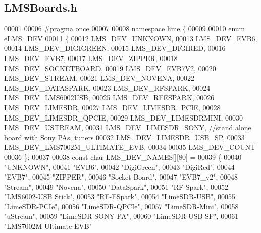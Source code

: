 \subsection{L\+M\+S\+Boards.\+h}
\label{LMSBoards_8h_source}

\begin{DoxyCode}
00001 
00006 \textcolor{preprocessor}{#pragma once}
00007 
00008 \textcolor{keyword}{namespace }lime \{
00009 
00010 \textcolor{keyword}{enum} eLMS_DEV
00011 \{
00012     LMS_DEV_UNKNOWN,
00013     LMS_DEV_EVB6,
00014     LMS_DEV_DIGIGREEN,
00015     LMS_DEV_DIGIRED,
00016     LMS_DEV_EVB7,
00017     LMS_DEV_ZIPPER,
00018     LMS_DEV_SOCKETBOARD,
00019     LMS_DEV_EVB7V2,
00020     LMS_DEV_STREAM,
00021     LMS_DEV_NOVENA,
00022     LMS_DEV_DATASPARK,
00023     LMS_DEV_RFSPARK,
00024     LMS_DEV_LMS6002USB,
00025     LMS_DEV_RFESPARK,
00026     LMS_DEV_LIMESDR,
00027     LMS_DEV_LIMESDR_PCIE,
00028     LMS_DEV_LIMESDR_QPCIE,
00029     LMS_DEV_LIMESDRMINI,
00030     LMS_DEV_USTREAM,
00031     LMS_DEV_LIMESDR_SONY, \textcolor{comment}{//stand alone board with Sony PAs, tuners}
00032     LMS_DEV_LIMESDR_USB_SP,
00033     LMS_DEV_LMS7002M_ULTIMATE_EVB,
00034 
00035     LMS_DEV_COUNT
00036 \};
00037 
00038 \textcolor{keyword}{const} \textcolor{keywordtype}{char} LMS_DEV_NAMES[][80] =
00039 \{
00040     \textcolor{stringliteral}{"UNKNOWN"},
00041     \textcolor{stringliteral}{"EVB6"},
00042     \textcolor{stringliteral}{"DigiGreen"},
00043     \textcolor{stringliteral}{"DigiRed"},
00044     \textcolor{stringliteral}{"EVB7"},
00045     \textcolor{stringliteral}{"ZIPPER"},
00046     \textcolor{stringliteral}{"Socket Board"},
00047     \textcolor{stringliteral}{"EVB7\_v2"},
00048     \textcolor{stringliteral}{"Stream"},
00049     \textcolor{stringliteral}{"Novena"},
00050     \textcolor{stringliteral}{"DataSpark"},
00051     \textcolor{stringliteral}{"RF-Spark"},
00052     \textcolor{stringliteral}{"LMS6002-USB Stick"},
00053     \textcolor{stringliteral}{"RF-ESpark"},
00054     \textcolor{stringliteral}{"LimeSDR-USB"},
00055     \textcolor{stringliteral}{"LimeSDR-PCIe"},
00056     \textcolor{stringliteral}{"LimeSDR-QPCIe"},
00057     \textcolor{stringliteral}{"LimeSDR-Mini"},
00058     \textcolor{stringliteral}{"uStream"},
00059     \textcolor{stringliteral}{"LimeSDR SONY PA"},
00060     \textcolor{stringliteral}{"LimeSDR-USB SP"},
00061     \textcolor{stringliteral}{"LMS7002M Ultimate EVB"}

\end{DoxyCode}
